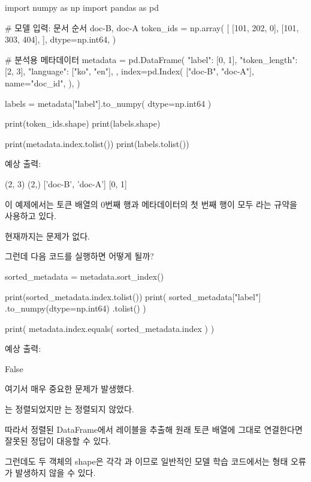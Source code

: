 \begin{dhkcode}
import numpy as np
import pandas as pd

# 모델 입력: 문서 순서 doc-B, doc-A
token_ids = np.array(
    [
        [101, 202, 0],
        [101, 303, 404],
    ],
    dtype=np.int64,
)

# 분석용 메타데이터
metadata = pd.DataFrame(
    {
        "label": [0, 1],
        "token_length": [2, 3],
        "language": ["ko", "en"],
    },
    index=pd.Index(
        ["doc-B", "doc-A"],
        name="doc_id",
    ),
)

labels = metadata["label"].to_numpy(
    dtype=np.int64
)

print(token_ids.shape)
print(labels.shape)

print(metadata.index.tolist())
print(labels.tolist())
\end{dhkcode}

예상 출력:

\begin{dhkzsh}
(2, 3)
(2,)
['doc-B', 'doc-A']
[0, 1]
\end{dhkzsh}

이 예제에서는 토큰 배열의 0번째 행과 메타데이터의 첫 번째 행이 모두 라는 규약을 사용하고 있다.

현재까지는 문제가 없다.

그런데 다음 코드를 실행하면 어떻게 될까?

\begin{dhkcode}
sorted_metadata = metadata.sort_index()

print(sorted_metadata.index.tolist())
print(
    sorted_metadata["label"]
    .to_numpy(dtype=np.int64)
    .tolist()
)

print(
    metadata.index.equals(
        sorted_metadata.index
    )
)
\end{dhkcode}

예상 출력:

\begin{dhkzsh}
False
\end{dhkzsh}

여기서 매우 중요한 문제가 발생했다.

는 정렬되었지만 는 정렬되지 않았다.

따라서 정렬된 DataFrame에서 레이블을 추출해 원래 토큰 배열에 그대로 연결한다면 잘못된 정답이 대응할 수 있다.

그런데도 두 객체의 shape은 각각 과 이므로 일반적인 모델 학습 코드에서는 형태 오류가 발생하지 않을 수 있다.

